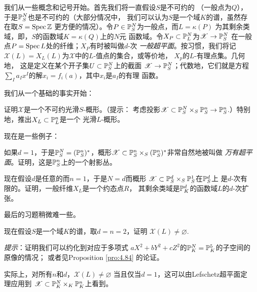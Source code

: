 我们从一些概念和记号开始。首先我们将一直假设$S$是不可约的
（一般点为$Q$），于是$\P_S^N$也是不可约的（大部分情况中，
我们可以认为$S$是一个域$K$的谱，虽然存在取$S=\spec \zz$
更方便的情况）。令$P\in \P_S^N$为一般点，而$L=\kappa(P)$
为其剩余类域，即，$S$的函数域$K=\kappa(Q)$上的$N$元
函数域。令$X_P\subset \P_L^N$为$\mathscr X\to \P_S^N$
在一般点$P=\spec L$处的纤维；$X_P$有时被叫做$d$-次
\textit{一般超平面}。按习惯，我们将记$\mathscr X(L)
=X_L(L)$为$\mathscr X$中的$L$-值点的集合，或等价地，
$X_p$的$L$-有理点集。几何地，%
这是定义在某个开子集$U\subset \P_S^N$上的截面
$\mathscr X\to \P_S^N$；代数地，它们就是方程
$\sum_I a_Ix^I$的解$x_i=f_i(a)$，其中$x_i$是$a_I$的有理
函数。

我们从一个基础的事实开始：

\begin{exe}\label{exe:3.51}
证明$\mathscr X$是一个不可约光滑$S$-概形。（提示：
考虑投影$\mathscr X\subset \P_S^N\times_S \P_S^n
\to \P_S^n$.）特别地，推出$X_L\subset \P^n_L$是一个
光滑$L$-概形。
\end{exe}

现在是一些例子：

\begin{exe}\label{exe:3.52}
如果$d=1$，于是$\P_S^N=(\P^n_S)^*$，概形$\mathscr X
\subset \P_S^n\times_S (\P^n_S)^*$非常自然地被叫做
\textit{万有超平面}。证明，这是$\P_S^n$上的一个射影丛。
\end{exe}

\begin{exe}\label{exe:3.53}
现在假设$d$是任意的而$n=1$，于是$N=d$而概形
$\mathscr X\subset \P_S^d\times_S \P^1_S$在$\P_S^d$上
是$d$-次有限的。证明，一般纤维$X_L$是一个约态点$R$，
其剩余类域是$\P_K^d$的函数域$L$的$d$-次扩张。
\end{exe}

最后的习题稍微难一些。

\begin{exe}\label{exe:3.54}
现在假设$S$是一个域$K$的谱，取$d=n=2$，证明
$\mathscr X(L)\neq \varnothing$.

\textit{提示}：证明我们可以约化到对应于多项式
$aX^2+bY^2+cZ^2$的$\P^N_K=\P^5_K$的子空间的原像的情况；
或者见Proposition \ref{pro:4.84} 的论证。
\end{exe}

实际上，对所有$n$和$d$，$\mathscr X(L)\neq \varnothing$
当且仅当$d=1$，这可以由Lefschetz超平面定理应用到
$\mathscr X\subset \P_K^N\times_K \P_K^n$上看到。